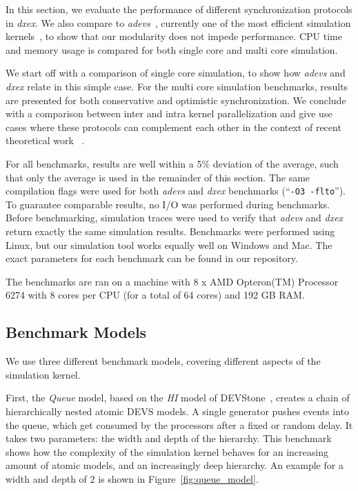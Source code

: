 In this section, we evaluate the performance of different synchronization protocols in \textit{dxex}.
We also compare to \textit{adevs}~\cite{adevs}, currently one of the most efficient simulation kernels~\cite{DEVStoneJournal}, to show that our modularity does not impede performance.
CPU time and memory usage is compared for both single core and multi core simulation.

We start off with a comparison of single core simulation, to show how \textit{adevs} and \textit{dxex} relate in this simple case.
For the multi core simulation benchmarks, results are presented for both conservative and optimistic synchronization.
We conclude with a comparison between inter and intra kernel parallelization and give use cases where these protocols can complement each other in the context of recent theoretical work ~\cite{amdahlpdevs}. 

For all benchmarks, results are well within a 5\% deviation of the average, such that only the average is used in the remainder of this section.
The same compilation flags were used for both \textit{adevs} and \textit{dxex} benchmarks (``\texttt{-O3 -flto}'').
To guarantee comparable results, no I/O was performed during benchmarks.
Before benchmarking, simulation traces were used to verify that \textit{adevs} and \textit{dxex} return exactly the same simulation results.
Benchmarks were performed using Linux, but our simulation tool works equally well on Windows and Mac.
The exact parameters for each benchmark can be found in our repository. 

The benchmarks are ran on a machine with 8 x AMD Opteron(TM) Processor 6274 with 8 cores per CPU (for a total of 64 cores) and 192 GB RAM.

\subsection{Benchmark Models}
We use three different benchmark models, covering different aspects of the simulation kernel.

First, the \textit{Queue} model, based on the \textit{HI} model of DEVStone~\cite{DEVStone}, creates a chain of hierarchically nested atomic \textsf{DEVS} models.
A single generator pushes events into the queue, which get consumed by the processors after a fixed or random delay.
It takes two parameters: the width and depth of the hierarchy.
This benchmark shows how the complexity of the simulation kernel behaves for an increasing amount of atomic models, and an increasingly deep hierarchy.
An example for a width and depth of 2 is shown in Figure~\ref{fig:queue_model}.
	
